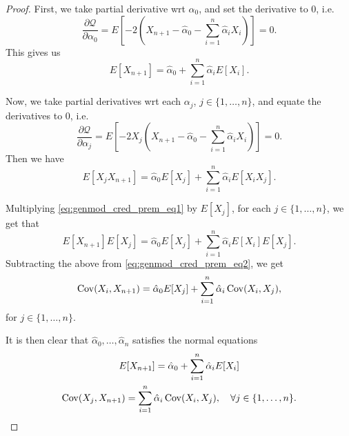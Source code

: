 \documentclass[notoc,notitlepage]{tufte-book}
\begin{document}
\begin{proof}
  First, we take partial derivative wrt $\alpha_0$, and set the derivative to
  $0$, i.e.
  \begin{equation*}
    \frac{\partial \mathcal{Q}}{\partial \alpha_0} = E \left[ -2 \left( X_{n+1}
    - \hat{\alpha}_0 - \sum_{i=1}^{n} \hat{\alpha}_i X_i \right) \right] = 0.
  \end{equation*}
  This gives us
  \begin{equation}\label{eq:genmod_cred_prem_eq1}
    E[X_{n+1}] = \hat{\alpha}_0 + \sum_{i=1}^{n} \hat{\alpha}_i E[X_i].
  \end{equation}

  Now, we take partial derivatives wrt each $\alpha_j$, $j \in \{ 1, \ldots,
  n\}$, and equate the derivatives to $0$, i.e.
  \begin{equation*}
    \frac{\partial \mathcal{Q}}{\partial \alpha_j} = E \left[ -2X_j \left(
    X_{n+1} - \hat{\alpha}_0 - \sum_{i=1}^{n} \hat{\alpha}_i X_i \right) \right]
    = 0.
  \end{equation*}
  Then we have
  \begin{equation}\label{eq:genmod_cred_prem_eq2}
    E[X_j X_{n+1}] = \hat{\alpha}_0 E[X_j] + \sum_{i=1}^{n} \hat{\alpha}_i E[X_i
    X_j].
  \end{equation}

  Multiplying \cref{eq:genmod_cred_prem_eq1} by $E[X_j]$, for each $j \in \{ 1,
  \ldots, n \}$, we get that
  \begin{equation*}
    E[X_{n+1}]E[X_j] = \hat{\alpha}_0 E[X_j] + \sum_{i=1}^{n} \hat{\alpha}_i
    E[X_i]E[X_j].
  \end{equation*}
  Subtracting the above from \cref{eq:genmod_cred_prem_eq2}, we get
  \begin{equation*}
    \operatorname{Cov}(X_i, X_{n+1}) = \hat{\alpha}_0 E[X_j] + \sum_{i=1}^{n} \hat{\alpha}_i
    \operatorname{Cov}(X_i, X_j),
  \end{equation*}
  for $j \in \{1, \ldots, n\}$.

  It is then clear that $\hat{\alpha}_0, \ldots, \hat{\alpha}_n$ satisfies the
  normal equations
  \begin{gather*}
    E[X_{n+1}] = \hat{\alpha}_0  + \sum_{i=1}^{n} \hat{\alpha}_i E[X_i] \\
    \operatorname{Cov}(X_j, X_{n+1}) = \sum_{i=1}^{n} \hat{\alpha}_i \operatorname{Cov}(X_i, X_j), \quad
    \forall j \in \{ 1, \ldots, n \}.
  \end{gather*}
\end{proof}
\end{document}
